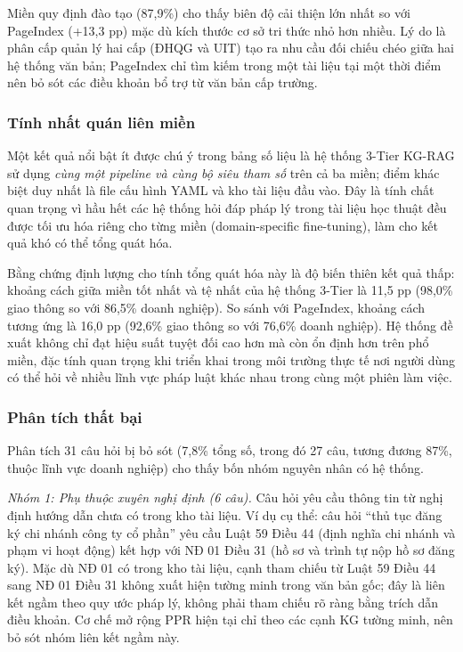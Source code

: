 Miền quy định đào tạo (87,9\%) cho thấy biên độ cải thiện lớn nhất so với PageIndex
(+13,3 pp) mặc dù kích thước cơ sở tri thức nhỏ hơn nhiều. Lý do là phân cấp quản lý
hai cấp (ĐHQG và UIT) tạo ra nhu cầu đối chiếu chéo giữa hai hệ thống văn bản;
PageIndex chỉ tìm kiếm trong một tài liệu tại một thời điểm nên bỏ sót các điều khoản
bổ trợ từ văn bản cấp trường.

\subsubsection*{Tính nhất quán liên miền}

Một kết quả nổi bật ít được chú ý trong bảng số liệu là hệ thống 3-Tier KG-RAG sử dụng
\textit{cùng một pipeline và cùng bộ siêu tham số} trên cả ba miền; điểm khác biệt duy
nhất là file cấu hình YAML và kho tài liệu đầu vào. Đây là tính chất quan trọng vì hầu
hết các hệ thống hỏi đáp pháp lý trong tài liệu học thuật đều được tối ưu hóa riêng cho
từng miền (domain-specific fine-tuning), làm cho kết quả khó có thể tổng quát hóa.

Bằng chứng định lượng cho tính tổng quát hóa này là độ biến thiên kết quả thấp:
khoảng cách giữa miền tốt nhất và tệ nhất của hệ thống 3-Tier là 11,5 pp (98,0\%
giao thông so với 86,5\% doanh nghiệp). So sánh với PageIndex, khoảng cách tương ứng
là 16,0 pp (92,6\% giao thông so với 76,6\% doanh nghiệp). Hệ thống đề xuất không chỉ
đạt hiệu suất tuyệt đối cao hơn mà còn ổn định hơn trên phổ miền, đặc tính quan
trọng khi triển khai trong môi trường thực tế nơi người dùng có thể hỏi về nhiều lĩnh
vực pháp luật khác nhau trong cùng một phiên làm việc.

\subsubsection*{Phân tích thất bại}

Phân tích 31 câu hỏi bị bỏ sót (7,8\% tổng số, trong đó 27 câu, tương đương 87\%,
thuộc lĩnh vực doanh nghiệp) cho thấy bốn nhóm nguyên nhân có hệ thống.

\textit{Nhóm 1: Phụ thuộc xuyên nghị định (6 câu).} Câu hỏi yêu cầu thông tin từ
nghị định hướng dẫn chưa có trong kho tài liệu. Ví dụ cụ thể: câu hỏi ``thủ tục đăng ký
chi nhánh công ty cổ phần'' yêu cầu Luật 59 Điều 44 (định nghĩa chi nhánh và phạm vi
hoạt động) kết hợp với NĐ 01 Điều 31 (hồ sơ và trình tự nộp hồ sơ đăng ký). Mặc dù
NĐ 01 có trong kho tài liệu, cạnh tham chiếu từ Luật 59 Điều 44 sang NĐ 01 Điều 31
không xuất hiện tường minh trong văn bản gốc; đây là liên kết ngầm theo quy ước
pháp lý, không phải tham chiếu rõ ràng bằng trích dẫn điều khoản. Cơ chế mở rộng
PPR hiện tại chỉ theo các cạnh KG tường minh, nên bỏ sót nhóm liên kết ngầm này.

